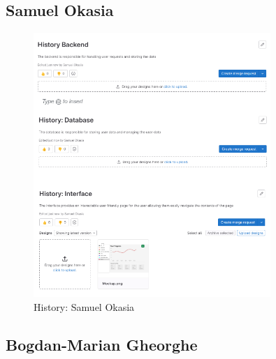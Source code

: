 \documentclass[a4paper]{article}
\begin{document}
\subsection{Samuel Okasia}
 
\begin{figure}[H]
	\centering
	\includegraphics[width=0.8\textwidth]{./images/History.png}
	\caption*{History: Samuel Okasia}
	\label{Fig.History}
\end{figure}

\subsection{Bogdan-Marian Gheorghe}
\end{document}
